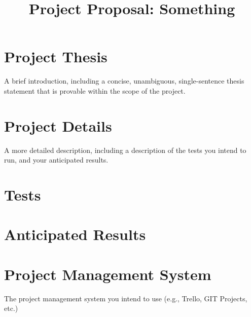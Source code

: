 \documentclass[conference]{IEEEtran}
\begin{document}
\title{Project Proposal:  Something}

\author{
}


\maketitle


\section{Project Thesis}
A brief introduction, including a concise, unambiguous, single-sentence thesis statement that is provable within the scope of the project.

\section{Project Details}
A more detailed description, including a description of the tests you intend to run, and your anticipated results.

\section{Tests}

\section{Anticipated Results}

\section{Project Management System}
The project management system you intend to use (e.g., Trello, GIT Projects, etc.)
\end{document}
